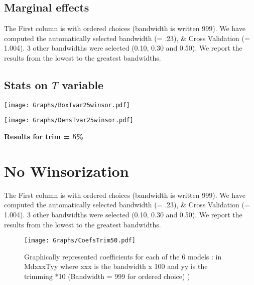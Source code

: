 \documentclass[a4paper]{article}
\begin{document}
\subsection{Marginal effects}

The First column is with ordered choices (bandwidth is written 999). We  have computed the  automatically selected bandwidth  (= .23), \& Cross Validation (= 1.004). 3 other  bandwidths were selected (0.10, 0.30 and 0.50). We report the results from the lowest to the greatest bandwidths. \\
\newpage
\subsection{Stats on $T$ variable}



\texttt{[image: Graphs/BoxTvar25winsor.pdf]}


\texttt{[image: Graphs/DensTvar25winsor.pdf]}




\newpage

\begin{center}
\Large{\textbf{Results for trim = 5\% }}
\end{center}

\section{No Winsorization}
The First column is with ordered choices (bandwidth is written 999). We  have computed the  automatically selected bandwidth  (= .23), \& Cross Validation (= 1.004). 3 other  bandwidths were selected (0.10, 0.30 and 0.50). We report the results from the lowest to the greatest bandwidths. \\



\newpage

\begin{sidewaysfigure}[h!]
\caption{Graphically represented coefficients for each of the 6 models : in MdxxxTyy  where xxx is the bandwidth x 100 and yy is the trimming *10 (Bandwidth = 999 for ordered choice) )}\label{PlotFOK}
\texttt{[image: Graphs/CoefsTrim50.pdf]}

\end{sidewaysfigure}
\clearpage
\end{document}
